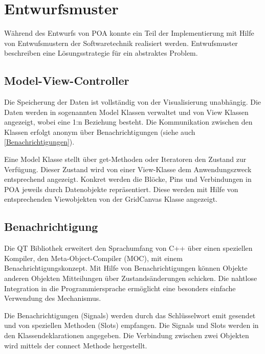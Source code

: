 
\section{Entwurfsmuster}

Während des Entwurfs von POA konnte ein Teil der Implementierung mit
Hilfe von Entwufsmustern der Softwaretechnik realisiert
werden. Entwufsmuster beschreiben eine Lösungsstrategie für ein
abstraktes Problem.

\subsection{Model-View-Controller}

Die Speicherung der Daten ist vollständig von der Visualisierung
unabhängig. Die Daten werden in sogenannten Model Klassen verwaltet
und von View Klassen angezeigt, wobei eine 1:n Beziehung besteht. Die
Kommunikation zwischen den Klassen erfolgt anonym über
Benachrichtigungen (siehe auch \ref{Benachrichtigungen}). 

Eine Model Klasse stellt über get-Methoden oder Iteratoren den Zustand
zur Verfügung. Dieser Zustand wird von einer View-Klasse dem
Anwendungszweck entsprechend angezeigt. Konkret werden die Blöcke,
Pins und Verbindungen in POA jeweils durch Datenobjekte
repräsentiert. Diese werden mit Hilfe von entsprechenden Viewobjekten von der
GridCanvas Klasse angezeigt. 

\subsection{Benachrichtigung}

Die QT Bibliothek erweitert den Sprachumfang von C++ über einen
speziellen Kompiler, den Meta-Object-Compiler (MOC), mit einem
Benachrichtigungskonzept. Mit Hilfe von
Benachrichtigungen können Objekte anderen Objekten Mitteilungen über
Zustandsänderungen schicken. Die nahtlose Integration in die
Programmiersprache ermöglicht eine besonders einfache Verwendung des
Mechanismus.

Die Benachrichtigungen (Signals) werden durch das Schlüsselwort emit
gesendet und von speziellen Methoden (Slots) empfangen. Die Signals
und Slots werden in den Klassendeklarationen angegeben. Die Verbindung
zwischen zwei Objekten wird mittels der connect Methode hergestellt. 

